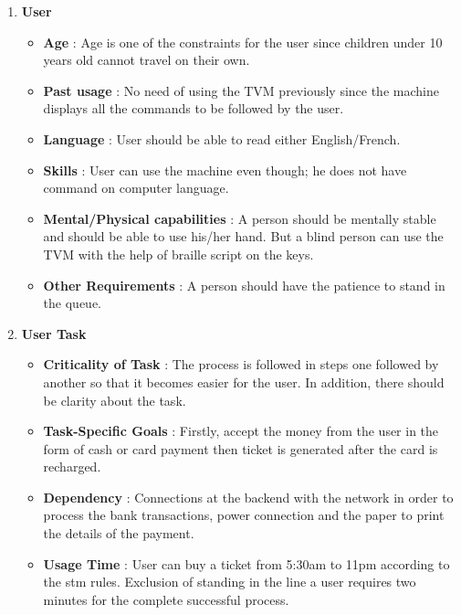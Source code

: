 \documentclass[15pt]{article}
\begin{document}
\begin{enumerate}[leftmargin=2em, itemsep=0pt, parsep=0pt, , font=\Large\bfseries]
    \item {\Large\bfseries User}
        \begin{itemize}
            \item {\Large\bfseries Age} : Age is one of the constraints for the user since children under 10 years old cannot travel on their own.
            \item {\Large\bfseries Past usage } : No need of using the TVM previously since the machine displays all the commands to be followed by the user.
            \item {\Large\bfseries Language} : User should be able to read either English/French.
            \item {\Large\bfseries Skills} : User can use the machine even though; he does not have command on computer language.
            \item {\Large\bfseries Mental/Physical capabilities} : A person should be mentally stable and should be able to use his/her hand. But a blind person can use the TVM with the help of braille script on the keys.
            \item {\Large\bfseries Other Requirements} : A person should have the patience to stand in the queue.
        \end{itemize}
        \vspace{1cm}
    \item {\Large\bfseries User Task}
        \begin{itemize}
            \item {\Large\bfseries Criticality of Task} : The process is followed in steps one followed by another so that it becomes easier for the user. In addition, there should be clarity about the task.
            \item {\Large\bfseries Task-Specific Goals} : Firstly, accept the money from the user in the form of cash or card payment then ticket is generated after the card is recharged.
            \item {\Large\bfseries Dependency} : Connections at the backend with the network in order to process the bank transactions, power connection and the paper to print the details of the payment.
            \item {\Large\bfseries Usage Time} : User can buy a ticket from 5:30am to 11pm according to the stm rules. Exclusion of standing in the line a user requires two minutes for the complete successful process.

\end{itemize}
\end{enumerate}
\end{document}
